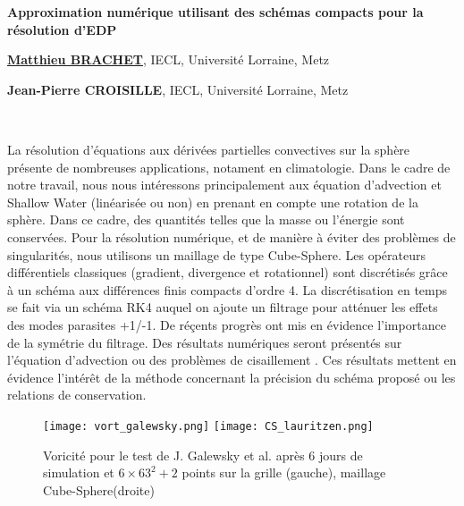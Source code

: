 \documentclass[10pt]{article}
\def\titre#1{\begin{center}{\Large{\bf #1}}\end{center}}
\def\orateur#1#2{\begin{center}{\underline{\large{\bf #1}}}, {#2}\end{center}}
\def\auteur#1#2{\begin{center}{\large{\bf #1}}, {#2}\end{center}}
\def\motscles#1{%
	\ifx#1\IsUndefined\relax\else\noindent{\normalsize{\bf Mots-cl\'es :}} #1\\ \fi}
\begin{document}
\thispagestyle{empty}

\def\Titre{Approximation numérique utilisant des schémas compacts pour la résolution d'EDP}
\def\NomOrateur{Matthieu BRACHET}
\def\AdresseCourteOrateur{IECL, Universit\'e Lorraine, Metz}
\def\AdresseLongueOrateur{Institut Elie Cartan de Lorraine, UMR 7502, Univ. Lorraine, Metz}
\def\EmailOrateur{email}

\def\NomAuteurI{Jean-Pierre CROISILLE}
\def\AdresseCourteAuteurI{IECL, Universit\'e Lorraine, Metz}
\def\AdresseLongueAuteurI{Institut Elie Cartan de Lorraine, UMR 7502, Univ. Lorraine, Metz}
\def\EmailAuteurI{jean-pierre.croisille@univ-lorraine.fr}

\titre{\Titre}%

\orateur{\NomOrateur}{\AdresseCourteOrateur}
\auteur{\NomAuteurI}{\AdresseCourteAuteurI}

\motscles{\listmotcles}

La résolution d'équations aux dérivées partielles convectives sur la sphère présente de nombreuses applications, notament en climatologie. 
Dans le cadre de notre travail, nous nous intéressons principalement aux équation d'advection et Shallow Water (linéarisée ou non) en prenant en compte une rotation de la sphère.
Dans ce cadre, des quantités telles que la masse ou l'énergie sont conservées.
Pour la résolution numérique, et de manière à éviter des problèmes de singularités, nous utilisons un maillage de type Cube-Sphere. Les opérateurs différentiels classiques (gradient, divergence et rotationnel) sont discrétisés grâce à un schéma aux différences finis compacts d'ordre 4. La discrétisation en temps se fait via un schéma RK4 auquel on ajoute un filtrage pour atténuer les effets des modes parasites +1/-1. De réçents progrès ont mis en évidence l'importance de la symétrie du filtrage.
Des résultats numériques seront présentés sur l'équation d'advection  \cite{Nair2008} ou des problèmes de cisaillement \cite{Galewsky2004}. Ces résultats mettent en évidence l'intérêt de la méthode concernant la précision du schéma proposé ou les relations de conservation.



\begin{figure}[ht]
\begin{center}
\texttt{[image: vort\_galewsky.png]}
\texttt{[image: CS\_lauritzen.png]}
\end{center}
\caption{Voricité pour le test de J. Galewsky et al. \cite{Galewsky2004} après 6 jours de simulation et  $6 \times 63^2 + 2$ points sur la grille (gauche), maillage Cube-Sphere(droite)}
\end{figure}
\end{document}
